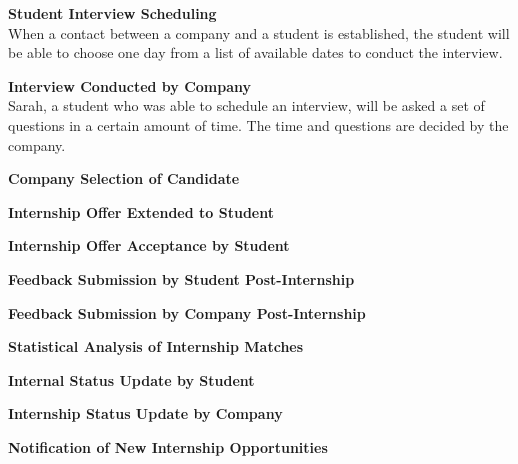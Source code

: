 {\begin{enumerate}[label=\textbf{[\arabic*]}, left = 0 pt, align = left]
\item \textbf{Student Interview Scheduling}  
\\When a contact between a company and a student is established, the student will be able to choose one day from a list of available dates to conduct the interview.
\item \textbf{Interview Conducted by Company}                        
\\ Sarah, a student who was able to schedule an interview, will be asked a set of questions in a certain amount of time. The time and questions are decided by the company.
\item \textbf{Company Selection of Candidate}                        
\\
\item \textbf{Internship Offer Extended to Student}                  
\\
\item \textbf{Internship Offer Acceptance by Student}                
\\
\item \textbf{Feedback Submission by Student Post-Internship}        
\\
\item \textbf{Feedback Submission by Company Post-Internship}        
\\
\item \textbf{Statistical Analysis of Internship Matches}            
\\
\item \textbf{Internal Status Update by Student}                     
\\
\item \textbf{Internship Status Update by Company}                   
\\
\item \textbf{Notification of New Internship Opportunities}          
\\

\end{enumerate}
}


